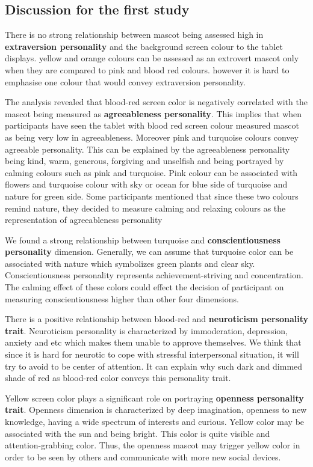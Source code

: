 \subsection{Discussion for the first study}
\par There is no strong relationship between mascot being assessed high in \textbf{extraversion personality} and the background screen colour to the tablet displays. yellow and orange colours can be assessed as an extrovert mascot only when they are compared to pink and blood red colours. however it is hard to emphasise one colour that would convey extraversion personality.
\par The analysis revealed that blood-red screen color is negatively correlated with the mascot being measured as \textbf{agreeableness personality}. This implies that when participants have seen the tablet with blood red screen colour measured mascot as being very low in agreeableness. Moreover pink and turquoise colours convey agreeable personality. This can be explained by the agreeableness personality being kind, warm, generous, forgiving and unselfish and being portrayed by calming colours such as pink and turquoise. Pink colour can be associated with flowers and turquoise colour with sky or ocean for blue side of turquoise and nature for green side. Some participants mentioned that since these two colours remind nature, they decided to measure calming and relaxing colours as the representation of agreeableness personality
\par We found a strong relationship between turquoise and \textbf{conscientiousness personality} dimension. Generally, we can assume that turquoise color can be associated with nature which symbolizes green plants and clear sky. Conscientiousness personality represents achievement-striving and concentration. The calming effect of these colors could effect the decision of participant on measuring conscientiousness higher than other four dimensions.
\par There is a positive relationship between blood-red and \textbf{neuroticism personality trait}. Neuroticism personality is characterized by immoderation, depression, anxiety and etc which makes them unable to approve themselves. We think that since it is hard for neurotic to cope with stressful interpersonal situation, it will try to avoid to be center of attention. It can explain why such dark and dimmed shade of red as blood-red color conveys this personality trait.
\par Yellow screen color plays a significant role on portraying \textbf{openness personality trait}. Openness dimension is characterized by deep imagination, openness to new knowledge, having a wide spectrum of interests and curious. Yellow color may be associated with the sun and being bright. This color is quite visible and attention-grabbing color. Thus, the openness mascot may trigger yellow color in order to be seen by others and communicate with more new social devices.

